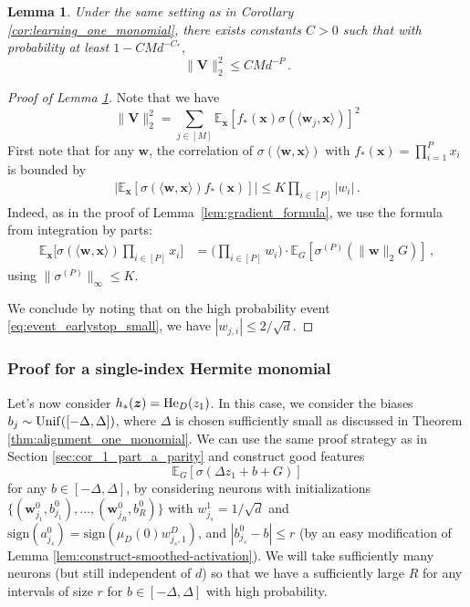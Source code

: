 \documentclass[11pt]{article}
\newcommand{\E}{\mathbb{E}}
\newcommand{\<}{\langle}
\renewcommand{\>}{\rangle}
\newcommand{\sign}{\text{sign}}
\newtheorem{lemma}{Lemma}
\theoremstyle{definition}
\def\bV{{\boldsymbol V}}
\def\bw{{\boldsymbol w}}
\def\bx{{\boldsymbol x}}
\def\bz{{\boldsymbol z}}
\def\Unif{{\rm Unif}}
\def\Unif{{\sf Unif}}
\def\Unif{{\sf Unif}}
\def\bz{{\boldsymbol z}}
\def\He{{\rm He}}
\def\bw{{\boldsymbol w}}
\def\bx{{\boldsymbol x}}
\def\Unif{{\rm Unif}}
\def\bV{{\boldsymbol V}}
\def\bz{{\boldsymbol z}}
\def\He{{\rm He}}
\begin{document}
\begin{lemma}\label{lem:correlation-at-initialization-bound}
Under the same setting as in Corollary \ref{cor:learning_one_monomial}, there exists  constants $C>0$ such that with probability at least $1 - CMd^{-C_*}$,
    \[
    \| \bV \|_2^2 \leq C M d^{-P} \, .
    \]
\end{lemma}
\begin{proof}[Proof of Lemma \ref{lem:correlation-at-initialization-bound}]
Note that we have
\[
\| \bV \|_2^2 = \sum_{j \in [M]} \E_{\bx} [f_*(\bx) \sigma ( \< \bw_j , \bx\>)]^2
\]
First note that for any $\bw$, the correlation of $\sigma(\<\bw,\bx\>)$ with $f_*(\bx) = \prod_{i=1}^{P} x_i$ is bounded by
\begin{align*}
|\E_{\bx}[\sigma(\<\bw,\bx\>)f_*(\bx)]| \leq K \prod_{i \in [P]} |w_i|\,.
\end{align*}
Indeed, as in the proof of Lemma~\ref{lem:gradient_formula}, we use the formula from integration by parts:
\begin{align*}
\E_{\bx} \Big[\sigma(\<\bw,\bx\>)\prod_{i \in [P]} x_i \Big] &= \Big(\prod_{i \in [P]} w_i \Big) \cdot \E_G[\sigma^{(P)}(\|\bw\|_2 G)]\,,
\end{align*}
using $\|\sigma^{(P)}\|_{\infty} \leq K$.

We conclude by noting that on the high probability event \eqref{eq:event_earlystop_small}, we have $| w_{j,i} | \leq 2 / \sqrt{d}$.
\end{proof}



\subsubsection{Proof for a single-index Hermite monomial}
\label{sec:single_hermite_case}


Let's now consider $h_* (\bz) = \He_D (z_1)$. In this case, we consider the biases $b_j \sim \Unif ( [ -\Delta, \Delta])$, where $\Delta$ is chosen sufficiently small as discussed in Theorem \ref{thm:alignment_one_monomial}. We can use the same proof strategy as in Section \ref{sec:cor_1_part_a_parity} and construct good features 
\[
\E_G [ \sigma ( \Delta z_1 + b + G )]
\]
for any $b \in [-\Delta, \Delta]$, by considering neurons with initializations $\{ (\bw_{j_1}^0,b_{j_1}^0) , \ldots , (\bw_{j_R}^0,b_{R}^0) \}$ with $w_{j_s}^1 = 1/\sqrt{d}$ and $\sign (a_{j_s}^0 ) = \sign (\mu_D (0) w_{j_s , 1}^D)$, and $|b_{j_s}^0 - b | \leq r$ (by an easy modification of Lemma \ref{lem:construct-smoothed-activation}). We will take sufficiently many neurons (but still independent of $d$) so that we have a sufficiently large $R$ for any intervals of size $r$ for $b \in [-\Delta, \Delta]$ with high probability.
\end{document}
